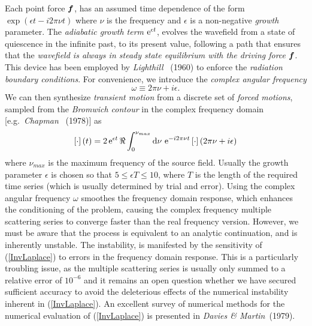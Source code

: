 \documentclass[11pt]{article}
\newcommand{\bmi}[1]{\mbox{\boldmath$\mit #1$\unboldmath}}
\begin{document}
Each point force  ${\bmi f}$,  has an assumed time
dependence of the form
$\exp(\epsilon t -i 2 \pi \nu t)$ where
$\nu $ is the  frequency and $\epsilon$ is a non-negative {\em
growth\/} parameter. The {\em adiabatic growth term\/} ${\rm e}^{\epsilon
t}$,
evolves the wavefield from a state of quiescence in the infinite past, to
its
present value, following a path that ensures that the {\em wavefield is
always in steady
state equilibrium with the driving force\/} ${\bmi f}$. This device has been
employed by
{\em Lighthill} ~(1960) to enforce the {\em radiation
boundary conditions\/}.
For  convenience, we introduce the {\em complex angular frequency\/}
\begin{equation} \label{w+}
\omega\equiv 2 \pi \nu +i \epsilon.
\end{equation}
We can then synthesize {\em transient motion\/} from a discrete set of
{\em
forced motions\/}, sampled from the {\em Bromwich contour\/} in the
complex frequency
domain [e.g.\ {\em Chapman} ~(1978)] as
\begin{equation}	\label{InvLaplace}
	\left[{\cdot }\right](t)=2 \, {\rm e}^{\epsilon  t}\,
	\Re \int_{ 0}^{\nu_{max}} {\rm d}\nu \ {\rm e}^{ -i
	2 \pi \nu t}\left[{\cdot }\right] (2 \pi \nu +i \epsilon)
\end{equation}
where $\nu_{{max}}$ is the maximum frequency of the source field.
Usually the growth parameter $\epsilon$ is chosen so that $5 \le \epsilon T
\le 10$, where $T$ is the length of the required time series (which is
usually determined by trial and error). Using the complex angular frequency $\omega$ smoothes the frequency domain
response, which enhances the conditioning of the problem,
causing the complex frequency multiple scattering series to converge
faster than the real frequency version. However, we must be aware that the
process is equivalent to an analytic continuation, and is inherently
unstable. The instability, is manifested by the sensitivity of
(\ref{InvLaplace}) to errors in the frequency domain response. This is a
particularly troubling issue, as the multiple scattering series is
usually only summed to a relative error of $10^{-6}$ and it remains an
open question whether we have secured sufficient accuracy to avoid the
deleterious effects of the numerical instability inherent in
(\ref{InvLaplace}). An excellent survey of numerical methods for the
numerical evaluation of (\ref{InvLaplace}) is presented in
{\em Davies \& Martin\/}~(1979).
\end{document}
